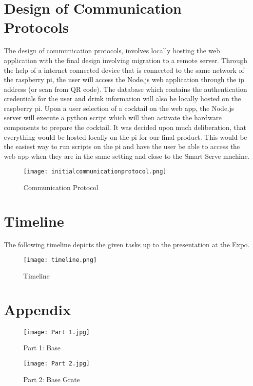 \documentclass[12pt, titlepage]{article}
\begin{document}
\section{Design of Communication Protocols}
The design of communication protocols, involves locally hosting the web application with the final design involving migration to a remote server. Through the help of a internet connected device that is connected to the same network of the raspberry pi, the user will access the Node.js web application through the ip address (or scan from QR code). The database which contains the authentication credentials for the user and drink information will also be locally hosted on the raspberry pi. Upon a user selection of a cocktail on the web app, the Node.js server will execute a python script which will then activate the hardware components to prepare the cocktail. It was decided upon much deliberation, that everything would be hosted locally on the pi for our final product. This would be the easiest way to run scripts on the pi and have the user be able to access the web app when they are in the same setting and close to the Smart Serve machine.

\begin{figure}[H]
    \centerline{\texttt{[image: initialcommunicationprotocol.png]}}
    \caption{Communication Protocol}
    \label{fig}
\end{figure}

\section{Timeline}
The following timeline depicts the given tasks up to the presentation at the Expo. 
\begin{figure}[H]
    \centerline{\texttt{[image: timeline.png]}}
    \caption{Timeline}
    \label{fig}
\end{figure}


\newpage{}

\section{Appendix}

\begin{figure}[H]
    \centerline{\texttt{[image: Part 1.jpg]}}
    \caption{Part 1: Base}
    \label{fig}
\end{figure}

\begin{figure}[H]
    \centerline{\texttt{[image: Part 2.jpg]}}
    \caption{Part 2: Base Grate}
    \label{fig}
\end{figure}
\end{document}
